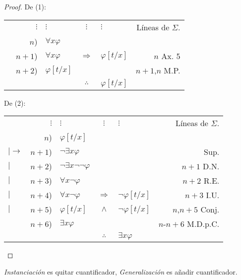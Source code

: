 \documentclass[12pt]{report}
\theoremstyle{largebreak}
\begin{document}
    \begin{proof}
        De (1):
        \begin{center}
            \begin{tabular}{l r l c l r}
                & $\vdots$ & $\vdots$ & $\vdots$ & $\vdots$ & Líneas de $\Sigma$. \\
                 & $n$) & $\forall x\varphi$ &  &  &  \\
                 & $n+1$) & $\forall x\varphi$ & $\Rightarrow$ & $\varphi[t/x]$ & $n$ Ax. 5 \\
                 & $n+2$) & $\varphi[t/x]$ &  &  & $n+1$,$n$ M.P. \\
                \hline
                & & & $\therefore$ & $\varphi[t/x]$ & \\
            \end{tabular}
        \end{center}
        De (2):
        \begin{center}
            \begin{tabular}{l r l c l r}
                & $\vdots$ & $\vdots$ & $\vdots$ & $\vdots$ & Líneas de $\Sigma$. \\
                 & $n$) & $\varphi[t/x]$ &  &  &  \\
                $|\longrightarrow$ & $n+1$) & $\neg\exists x\varphi$ &  &  & Sup. \\
                $|$ & $n+2$) & $\neg\exists x\neg\neg\varphi$ &  &  & $n+1$ D.N. \\
                $|$ & $n+3$) & $\forall x\neg\varphi$ &  &  & $n+2$ R.E. \\
                $|$ & $n+4$) & $\forall x\neg\varphi$ & $\Rightarrow$ & $\neg\varphi[t/x]$ & $n+3$ I.U. \\
                $|$ & $n+5$) & $\varphi[t/x]$ & $\land$ & $\neg\varphi[t/x]$ & $n$,$n+5$ Conj. \\
                \hline
                 & $n+6$) & $\exists x\varphi$ &  &  & $n$-$n+6$ M.D.p.C. \\
                \hline
                & & & $\therefore$ & $\exists x\varphi$ & \\
            \end{tabular}
        \end{center}
    \end{proof}

    \begin{obs}
        \textit{Instanciación} es quitar cuantificador, \textit{Generalización} es añadir cuantificador.
    \end{obs}
\end{document}
